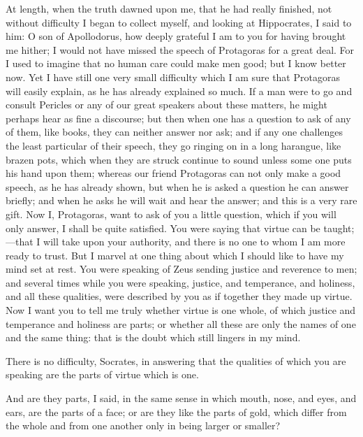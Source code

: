 \documentclass[11pt,letter]{article}
\begin{document}
\par  At length, when the truth dawned upon me, that he had really finished, not without difficulty I began to collect myself, and looking at Hippocrates, I said to him: O son of Apollodorus, how deeply grateful I am to you for having brought me hither; I would not have missed the speech of Protagoras for a great deal. For I used to imagine that no human care could make men good; but I know better now. Yet I have still one very small difficulty which I am sure that Protagoras will easily explain, as he has already explained so much. If a man were to go and consult Pericles or any of our great speakers about these matters, he might perhaps hear as fine a discourse; but then when one has a question to ask of any of them, like books, they can neither answer nor ask; and if any one challenges the least particular of their speech, they go ringing on in a long harangue, like brazen pots, which when they are struck continue to sound unless some one puts his hand upon them; whereas our friend Protagoras can not only make a good speech, as he has already shown, but when he is asked a question he can answer briefly; and when he asks he will wait and hear the answer; and this is a very rare gift. Now I, Protagoras, want to ask of you a little question, which if you will only answer, I shall be quite satisfied. You were saying that virtue can be taught;—that I will take upon your authority, and there is no one to whom I am more ready to trust. But I marvel at one thing about which I should like to have my mind set at rest. You were speaking of Zeus sending justice and reverence to men; and several times while you were speaking, justice, and temperance, and holiness, and all these qualities, were described by you as if together they made up virtue. Now I want you to tell me truly whether virtue is one whole, of which justice and temperance and holiness are parts; or whether all these are only the names of one and the same thing: that is the doubt which still lingers in my mind.

\par  There is no difficulty, Socrates, in answering that the qualities of which you are speaking are the parts of virtue which is one.

\par  And are they parts, I said, in the same sense in which mouth, nose, and eyes, and ears, are the parts of a face; or are they like the parts of gold, which differ from the whole and from one another only in being larger or smaller?
\end{document}
